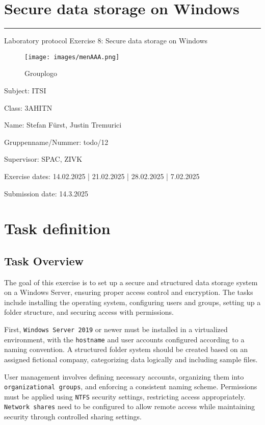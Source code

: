 \documentclass[a4paper]{article}
\begin{document}
\raggedright

\pagestyle{oida}
\section*{Secure data storage on Windows}
\par\noindent\rule{\textwidth}{0.4pt}

Laboratory protocol
Exercise 8: Secure data storage on Windows

\begin{figure}[h]
	\texttt{[image: images/menAAA.png]}
	\centering
	\caption{Grouplogo}
\end{figure}

\vspace*{\fill}
Subject:	ITSI

Class:	3AHITN

Name:	Stefan Fürst, Justin Tremurici

Gruppenname/Nummer: todo/12

Supervisor: 	SPAC, ZIVK

Exercise dates:	14.02.2025 | 21.02.2025 | 28.02.2025 | 7.02.2025

Submission date: 14.3.2025


\newpage
\tableofcontents

\newpage

\section{Task definition}
\subsection{Task Overview}
The goal of this exercise is to set up a secure and structured data storage system on a Windows Server, ensuring proper access control and encryption. The tasks include installing the operating system, configuring users and groups, setting up a folder structure, and securing access with permissions.

First, \texttt{Windows Server 2019} or newer must be installed in a virtualized environment, with the \texttt{hostname} and user accounts configured according to a naming convention. A structured folder system should be created based on an assigned fictional company, categorizing data logically and including sample files.

User management involves defining necessary accounts, organizing them into \texttt{organizational groups}, and enforcing a consistent naming scheme. Permissions must be applied using \texttt{NTFS} security settings, restricting access appropriately. \texttt{Network shares} need to be configured to allow remote access while maintaining security through controlled sharing settings.
\end{document}
